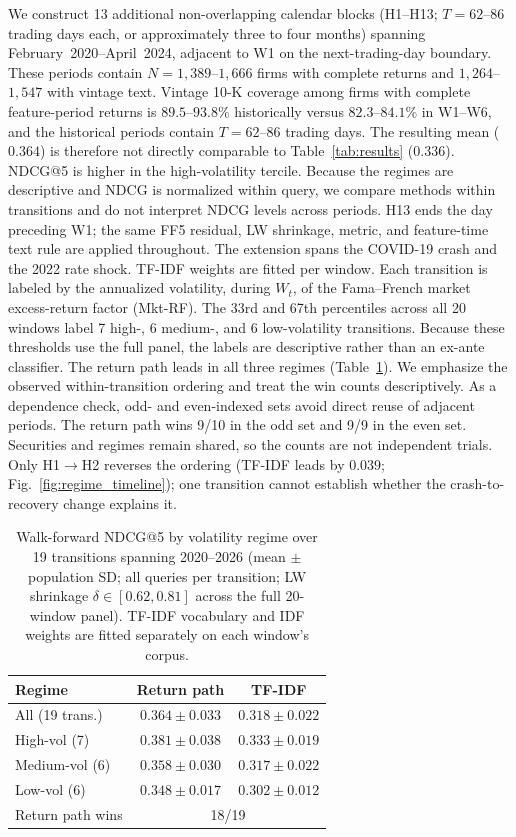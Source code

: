 \documentclass[sigconf,anonymous]{acmart}
\begin{document}
We construct 13 additional non-overlapping calendar blocks (H1--H13; $T = 62$--$86$
trading days each, or approximately three to four months) spanning
February~2020--April~2024, adjacent to W1 on the next-trading-day boundary.
These periods contain $N=1{,}389$--$1{,}666$ firms with complete returns and
$1{,}264$--$1{,}547$ with vintage text.  Vintage 10-K coverage among firms with
complete feature-period returns is
$89.5$--$93.8\%$ historically versus $82.3$--$84.1\%$ in W1--W6, and
the historical periods contain $T=62$--$86$ trading days.  The resulting mean
($0.364$) is therefore not directly comparable to
Table~\ref{tab:results} ($0.336$).
NDCG@5 is higher in the high-volatility tercile.  Because the regimes are
descriptive and NDCG is normalized within query, we compare methods within
transitions and do not interpret NDCG levels across periods.
H13 ends the day preceding W1; the same FF5 residual, LW shrinkage, metric, and
feature-time text rule are applied throughout.
The extension spans the COVID-19 crash and the 2022 rate shock.
TF-IDF weights are fitted per window.
Each transition is labeled by the annualized volatility, during $W_t$, of the
Fama--French market excess-return factor (Mkt-RF).  The 33rd and 67th percentiles
across all 20 windows label 7 high-, 6 medium-, and 6 low-volatility
transitions.  Because these thresholds use the full panel, the labels are
descriptive rather than an ex-ante classifier.
The return path leads in all three regimes (Table~\ref{tab:historical}).  We
emphasize the observed within-transition ordering and treat the win counts
descriptively.
As a dependence check, odd- and even-indexed sets avoid direct reuse of adjacent
periods.  The return path wins 9/10 in the odd set and 9/9 in the even set.
Securities and regimes remain shared, so the counts are not independent trials.
Only H1$\to$H2 reverses the ordering (TF-IDF leads by $0.039$;
Fig.~\ref{fig:regime_timeline}); one transition cannot establish whether the
crash-to-recovery change explains it.

\begin{table}[t]
\caption{Walk-forward NDCG@5 by volatility regime over 19 transitions spanning
2020--2026 (mean $\pm$ population SD; all queries per transition; LW shrinkage
$\delta\in[0.62,0.81]$ across the full 20-window panel).
TF-IDF vocabulary and IDF weights are fitted separately on each window's
corpus.}
\label{tab:historical}
\small
\begin{tabular}{lcc}
\toprule
\textbf{Regime} & \textbf{Return path} & \textbf{TF-IDF} \\
\midrule
All (19 trans.) & $0.364\pm0.033$ & $0.318\pm0.022$ \\
High-vol (7)    & $0.381\pm0.038$ & $0.333\pm0.019$ \\
Medium-vol (6)  & $0.358\pm0.030$ & $0.317\pm0.022$ \\
Low-vol (6)     & $0.348\pm0.017$ & $0.302\pm0.012$ \\
\midrule
\multicolumn{1}{l}{Return path wins} & \multicolumn{2}{c}{18/19} \\
\bottomrule
\end{tabular}
\end{table}
\end{document}
